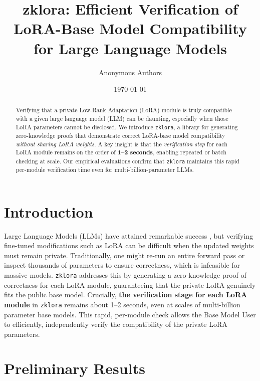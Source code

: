 \documentclass[11pt]{article}
\title{\textbf{zklora: Efficient Verification of LoRA-Base Model Compatibility for Large Language Models}}
\author{Anonymous Authors}
\date{\today}
\begin{document}
\maketitle

\begin{abstract}
Verifying that a private Low-Rank Adaptation (LoRA) module is truly compatible with a given large language model (LLM) can be daunting, especially when those LoRA parameters cannot be disclosed. 
We introduce \texttt{zklora}, a library for generating zero-knowledge proofs that demonstrate correct LoRA-base model compatibility \emph{without sharing LoRA weights}. 
A key insight is that the \emph{verification step} for each LoRA module remains on the order of \textbf{1--2 seconds}, enabling repeated or batch checking at scale. 
Our empirical evaluations confirm that \texttt{zklora} maintains this rapid per-module verification time even for multi-billion-parameter LLMs.
\end{abstract}

\section{Introduction}
Large Language Models (LLMs) have attained remarkable success \cite{brown2020language, devlin2018bert}, but verifying fine-tuned modifications such as LoRA \cite{hu2021lora} can be difficult when the updated weights must remain private. 
Traditionally, one might re-run an entire forward pass or inspect thousands of parameters to ensure correctness, which is infeasible for massive models. 
\texttt{zklora} addresses this by generating a zero-knowledge proof of correctness for each LoRA module, guaranteeing that the private LoRA genuinely fits the public base model. 
Crucially, \textbf{the verification stage for each LoRA module} in \texttt{zklora} remains about 1--2 seconds, even at scales of multi-billion parameter base models. 
This rapid, per-module check allows the Base Model User to efficiently, independently verify the compatibility of the private LoRA parameters.

\section{Preliminary Results}
\end{document}
